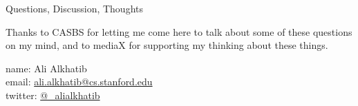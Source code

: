 \documentclass[presentation]{subfiles}
\begin{document}
  \begin{frame}{Questions, Discussion, Thoughts}

      Thanks to CASBS for letting me come here to talk about some of these questions on my mind, and to mediaX for supporting my thinking about these things.
  
      name: {Ali Alkhatib} \\
      email: \href{mailto:ali.alkhatib@cs.stanford.edu}{ali.alkhatib@cs.stanford.edu} \\
      twitter: \href{https://twitter.com/_alialkhatib}{@\_alialkhatib} \\
  \end{frame}
\end{document}
